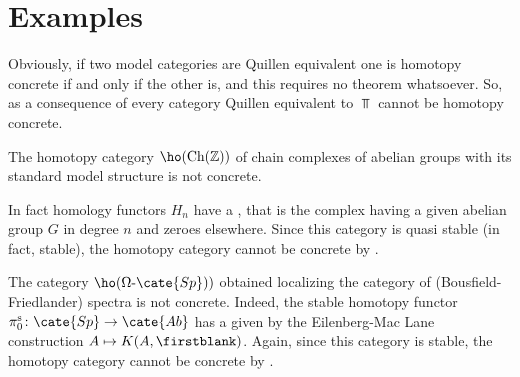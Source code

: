 \section{Examples}
\begin{example}[Example 0]
Obviously, if two model categories are Quillen equivalent one is homotopy concrete if and only if the other is, and this requires no theorem whatsoever. So, as a consequence of  every category Quillen equivalent to $\Top$ cannot be homotopy concrete. 
\end{example}
\begin{example}\label{complessi}
The homotopy category $\ho(\text{Ch}(\mathbb{Z}))$ of chain complexes of abelian groups with its standard model structure is not concrete. 

In fact homology functors $H_n$ have a \wco, that is the complex having a given abelian group $G$ in degree $n$ and zeroes elsewhere. Since this category is quasi stable (in fact, stable), the homotopy category cannot be concrete by \athm{}.
\end{example}
\begin{example}[Spectra]\label{spectra}
The category $\ho(\Omega\text{-}\cate{Sp}))$ obtained localizing the category of (Bousfield\hyp{}Friedlander) spectra is not concrete. Indeed, the stable homotopy functor $\pi^\text{s}_0 \colon \cate{Sp} \to \cate{Ab}$ has a \wco given by the Eilenberg-Mac Lane construction $A\mapsto K(A,\firstblank)$. Again, since this category is stable, the homotopy category cannot be concrete by \athm{}.
\end{example}
